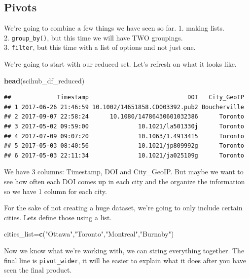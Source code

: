 \documentclass[
]{article}
\newenvironment{Shaded}{\begin{snugshade}}{\end{snugshade}}
\newcommand{\FunctionTok}[1]{\textcolor[rgb]{0.13,0.29,0.53}{\textbf{#1}}}
\newcommand{\NormalTok}[1]{#1}
\newcommand{\OtherTok}[1]{\textcolor[rgb]{0.56,0.35,0.01}{#1}}
\newcommand{\StringTok}[1]{\textcolor[rgb]{0.31,0.60,0.02}{#1}}
\begin{document}
\subsection{Pivots}\label{pivots}

We're going to combine a few things we have seen so far. 1. making
lists.\\
2. \texttt{group\_by()}, but this time we will have TWO groupings.\\
3. \texttt{filter}, but this time with a list of options and not just
one.

We're going to start with our reduced set. Let's refresh on what it
looks like.

\begin{Shaded}
\begin{Highlighting}[]
\FunctionTok{head}\NormalTok{(scihub\_df\_reduced)}
\end{Highlighting}
\end{Shaded}

\begin{verbatim}
##             Timestamp                            DOI   City_GeoIP
## 1 2017-06-26 21:46:59 10.1002/14651858.CD003392.pub2 Boucherville
## 2 2017-09-07 22:58:24      10.1080/14786430601032386      Toronto
## 3 2017-05-02 09:59:00              10.1021/la501330j      Toronto
## 4 2017-07-09 09:07:20              10.1063/1.4913415      Toronto
## 5 2017-05-03 08:40:56              10.1021/jp809992g      Toronto
## 6 2017-05-03 22:11:34              10.1021/ja025109g      Toronto
\end{verbatim}

We have 3 columns: Timestamp, DOI and City\_GeoIP. But maybe we want to
see how often each DOI comes up in each city and the organize the
information so we have 1 column for each city.

For the sake of not creating a huge dataset, we're going to only include
certain cities. Lets define those using a list.

\begin{Shaded}
\begin{Highlighting}[]
\NormalTok{cities\_list}\OtherTok{=}\FunctionTok{c}\NormalTok{(}\StringTok{"Ottawa"}\NormalTok{,}\StringTok{"Toronto"}\NormalTok{,}\StringTok{"Montreal"}\NormalTok{,}\StringTok{"Burnaby"}\NormalTok{)}
\end{Highlighting}
\end{Shaded}

Now we know what we're working with, we can string everything together.
The final line is \texttt{pivot\_wider}, it will be easier to explain
what it does after you have seen the final product.
\end{document}
